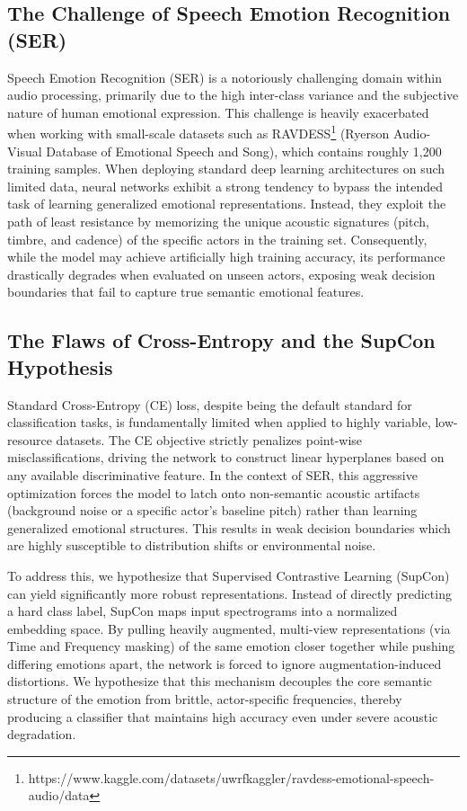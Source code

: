 \documentclass[12pt,hitec]{report}
\begin{document}
\subsection{The Challenge of Speech Emotion Recognition (SER)}
Speech Emotion Recognition (SER) is a notoriously challenging domain within audio processing, primarily due to the high inter-class variance and the subjective nature of human emotional expression. This challenge is heavily exacerbated when working with small-scale datasets such as RAVDESS\footnote{https://www.kaggle.com/datasets/uwrfkaggler/ravdess-emotional-speech-audio/data} (Ryerson Audio-Visual Database of Emotional Speech and Song), which contains roughly 1,200 training samples. When deploying standard deep learning architectures on such limited data, neural networks exhibit a strong tendency to bypass the intended task of learning generalized emotional representations. Instead, they exploit the path of least resistance by memorizing the unique acoustic signatures (pitch, timbre, and cadence) of the specific actors in the training set. Consequently, while the model may achieve artificially high training accuracy, its performance drastically degrades when evaluated on unseen actors, exposing weak decision boundaries that fail to capture true semantic emotional features.


\subsection{The Flaws of Cross-Entropy and the SupCon Hypothesis}
 Standard Cross-Entropy (CE) loss, despite being the default standard for classification tasks, is fundamentally limited when applied to highly variable, low-resource datasets. The CE objective strictly penalizes point-wise misclassifications, driving the network to construct linear hyperplanes based on any available discriminative feature. In the context of SER, this aggressive optimization forces the model to latch onto non-semantic acoustic artifacts (background noise or a specific actor's baseline pitch) rather than learning generalized emotional structures. This results in weak decision boundaries which are highly susceptible to distribution shifts or environmental noise.

To address this, we hypothesize that Supervised Contrastive Learning (SupCon) can yield significantly more robust representations. Instead of directly predicting a hard class label, SupCon maps input spectrograms into a normalized embedding space. By pulling heavily augmented, multi-view representations (via Time and Frequency masking) of the same emotion closer together while pushing differing emotions apart, the network is forced to ignore augmentation-induced distortions. We hypothesize that this mechanism decouples the core semantic structure of the emotion from brittle, actor-specific frequencies, thereby producing a classifier that maintains high accuracy even under severe acoustic degradation.
\end{document}
